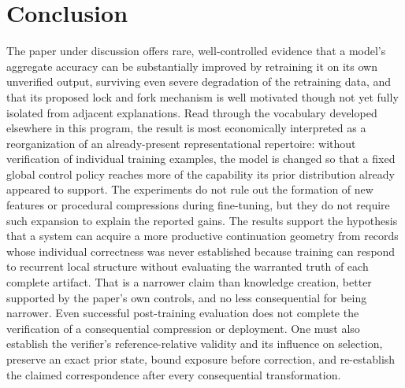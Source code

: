 \documentclass[11pt]{article}
\begin{document}
\section{Conclusion}

The paper under discussion offers rare, well-controlled evidence that a model's aggregate accuracy can be substantially improved by retraining it on its own unverified output, surviving even severe degradation of the retraining data, and that its proposed lock and fork mechanism is well motivated though not yet fully isolated from adjacent explanations. Read through the vocabulary developed elsewhere in this program, the result is most economically interpreted as a reorganization of an already-present representational repertoire: without verification of individual training examples, the model is changed so that a fixed global control policy reaches more of the capability its prior distribution already appeared to support. The experiments do not rule out the formation of new features or procedural compressions during fine-tuning, but they do not require such expansion to explain the reported gains. The results support the hypothesis that a system can acquire a more productive continuation geometry from records whose individual correctness was never established because training can respond to recurrent local structure without evaluating the warranted truth of each complete artifact. That is a narrower claim than knowledge creation, better supported by the paper's own controls, and no less consequential for being narrower. Even successful post-training evaluation does not complete the verification of a consequential compression or deployment. One must also establish the verifier's reference-relative validity and its influence on selection, preserve an exact prior state, bound exposure before correction, and re-establish the claimed correspondence after every consequential transformation.
\end{document}
